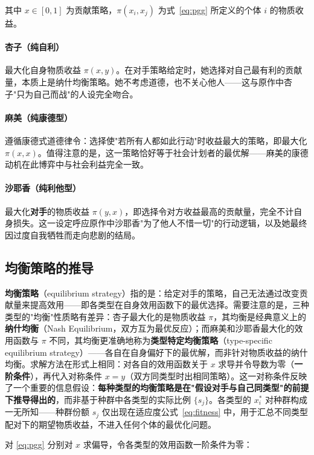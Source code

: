 \documentclass[12pt]{article}
\begin{document}
其中 $x \in [0,1]$ 为贡献策略，$\pi(x_i, x_j)$ 为式~\eqref{eq:pgg} 所定义的个体 $i$ 的物质收益。

\paragraph{杏子（纯自利）} 最大化自身物质收益 $\pi(x,y)$。在对手策略给定时，她选择对自己最有利的贡献量，本质上是纳什均衡策略。她不考虑道德，也不关心他人——这与原作中杏子"只为自己而战"的人设完全吻合。

\paragraph{麻美（纯康德型）} 遵循康德式道德律令：选择使"若所有人都如此行动"时收益最大的策略，即最大化 $\pi(x,x)$。值得注意的是，这一策略恰好等于社会计划者的最优解——麻美的康德动机在此博弈中与社会利益完全一致。

\paragraph{沙耶香（纯利他型）} 最大化\textbf{对手}的物质收益 $\pi(y,x)$，即选择令对方收益最高的贡献量，完全不计自身损失。这一设定呼应原作中沙耶香"为了他人不惜一切"的行动逻辑，以及她最终因过度自我牺牲而走向悲剧的结局。

\subsection{均衡策略的推导}\label{sub:equilibrium}

\textbf{均衡策略}（equilibrium strategy）指的是：给定对手的策略，自己无法通过改变贡献量来提高效用——即各类型在自身效用函数下的最优选择。需要注意的是，三种类型的"均衡"性质略有差异：杏子最大化的是物质收益 $\pi$，其均衡是经典意义上的\textbf{纳什均衡}（Nash Equilibrium，双方互为最优反应）；而麻美和沙耶香最大化的效用函数与 $\pi$ 不同，其均衡更准确地称为\textbf{类型特定均衡策略}（type-specific equilibrium strategy）——各自在自身偏好下的最优解，而非针对物质收益的纳什均衡。求解方法在形式上相同：对各自的效用函数关于 $x$ 求导并令导数为零（\textbf{一阶条件}），再代入对称条件 $x = y$（双方同类型时出相同策略）。这一对称条件反映了一个重要的信息假设：\textbf{每种类型的均衡策略是在"假设对手与自己同类型"的前提下推导得出的}，而非基于种群中各类型的实际比例 $\{s_j\}$。各类型的 $x_i^*$ 对种群构成一无所知——种群份额 $s_j$ 仅出现在适应度公式~\eqref{eq:fitness} 中，用于汇总不同类型配对下的期望物质收益，不进入任何个体的最优化问题。

对 \eqref{eq:pgg} 分别对 $x$ 求偏导，令各类型的效用函数一阶条件为零：
\end{document}
